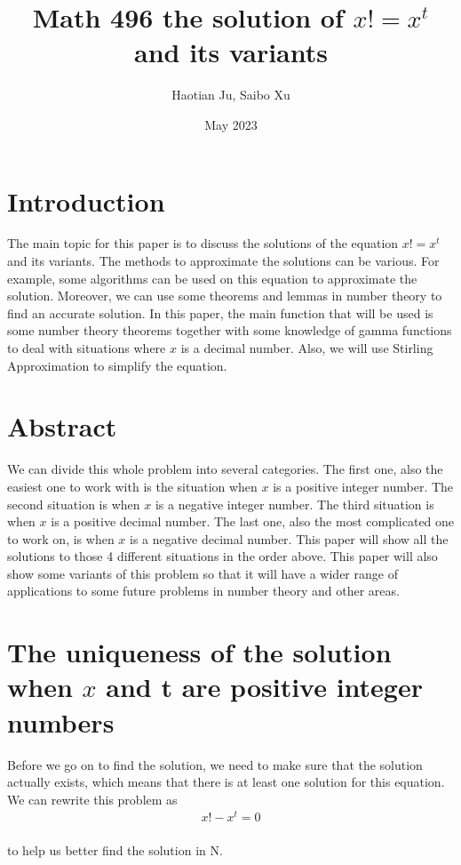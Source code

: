 \documentclass{article}
\title{Math 496 the solution of $x! = x ^ {t}$ and its variants}
\author{Haotian Ju, Saibo Xu}
\date{May 2023}
\begin{document}
\maketitle
        \tableofcontents
        \newpage
        \section{Introduction}
        The main topic for this paper is to discuss the solutions of the equation $x! = x ^ {t}$ and its variants. The methods to approximate the solutions can be various. For example, some algorithms can be used on this equation to approximate the solution. Moreover, we can use some theorems and lemmas in number theory to find an accurate solution. In this paper, the main function that will be used is some number theory theorems together with some knowledge of gamma functions to deal with situations where $x$ is a decimal number. Also, we will use Stirling Approximation to simplify the equation.

        \section{Abstract}
        We can divide this whole problem into several categories. The first one, also the easiest one to work with is the situation when $x$ is a positive integer number. The second situation is when $x$ is a negative integer number. The third situation is when $x$ is a positive decimal number. The last one, also the most complicated one to work on, is when $x$ is a negative decimal number. This paper will show all the solutions to those 4 different situations in the order above. This paper will also show some variants of this problem so that it will have a wider range of applications to some future problems in number theory and other areas.

        \section{The uniqueness of the solution when $x$ and t are positive integer numbers}
        Before we go on to find the solution, we need to make sure that the solution actually exists, which means that there is at least one solution for this equation. We can rewrite this problem as\\
            \begin{align*}
                x! - x ^ {t} = 0
            \end{align*}\\
        to help us better find the solution in N.\\
\end{document}
